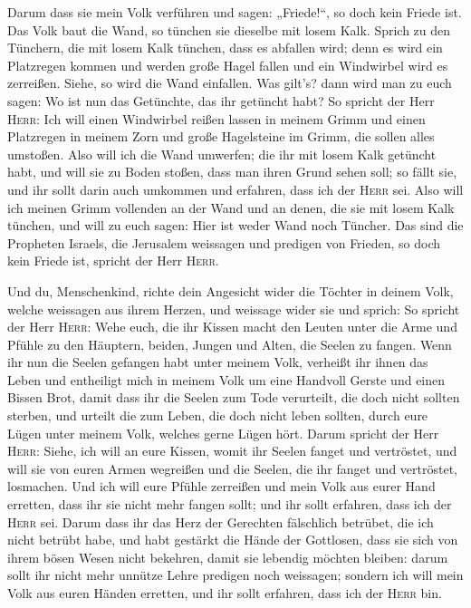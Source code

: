  Darum dass sie mein Volk verführen und sagen:
„Friede!{}``, so doch kein Friede ist. Das Volk baut die Wand, so
tünchen sie dieselbe mit losem Kalk.  Sprich zu den
Tünchern, die mit losem Kalk tünchen, dass es abfallen wird; denn es
wird ein Platzregen kommen und werden große Hagel fallen und ein
Windwirbel wird es zerreißen.  Siehe, so wird die Wand
einfallen. Was gilt's? dann wird man zu euch sagen: Wo ist nun das
Getünchte, das ihr getüncht habt?  So spricht der Herr
\textsc{Herr}: Ich will einen Windwirbel reißen lassen in meinem Grimm
und einen Platzregen in meinem Zorn und große Hagelsteine im Grimm, die
sollen alles umstoßen.  Also will ich die Wand umwerfen;
die ihr mit losem Kalk getüncht habt, und will sie zu Boden stoßen, dass
man ihren Grund sehen soll; so fällt sie, und ihr sollt darin auch
umkommen und erfahren, dass ich der \textsc{Herr} sei. 
Also will ich meinen Grimm vollenden an der Wand und an denen, die sie
mit losem Kalk tünchen, und will zu euch sagen: Hier ist weder Wand noch
Tüncher.  Das sind die Propheten Israels, die Jerusalem
weissagen und predigen von Frieden, so doch kein Friede ist, spricht der
Herr \textsc{Herr}.

 Und du, Menschenkind, richte dein Angesicht wider die
Töchter in deinem Volk, welche weissagen aus ihrem Herzen, und weissage
wider sie  und sprich: So spricht der Herr \textsc{Herr}:
Wehe euch, die ihr Kissen macht den Leuten unter die Arme und Pfühle zu
den Häuptern, beiden, Jungen und Alten, die Seelen zu fangen. Wenn ihr
nun die Seelen gefangen habt unter meinem Volk, verheißt ihr ihnen das
Leben  und entheiligt mich in meinem Volk um eine
Handvoll Gerste und einen Bissen Brot, damit dass ihr die Seelen zum
Tode verurteilt, die doch nicht sollten sterben, und urteilt die zum
Leben, die doch nicht leben sollten, durch eure Lügen unter meinem Volk,
welches gerne Lügen hört.  Darum spricht der Herr
\textsc{Herr}: Siehe, ich will an eure Kissen, womit ihr Seelen fanget
und vertröstet, und will sie von euren Armen wegreißen und die Seelen,
die ihr fanget und vertröstet, losmachen.  Und ich will
eure Pfühle zerreißen und mein Volk aus eurer Hand erretten, dass ihr
sie nicht mehr fangen sollt; und ihr sollt erfahren, dass ich der
\textsc{Herr} sei.  Darum dass ihr das Herz der Gerechten
fälschlich betrübet, die ich nicht betrübt habe, und habt gestärkt die
Hände der Gottlosen, dass sie sich von ihrem bösen Wesen nicht bekehren,
damit sie lebendig möchten bleiben:  darum sollt ihr
nicht mehr unnütze Lehre predigen noch weissagen; sondern ich will mein
Volk aus euren Händen erretten, und ihr sollt erfahren, dass ich der
\textsc{Herr} bin.


